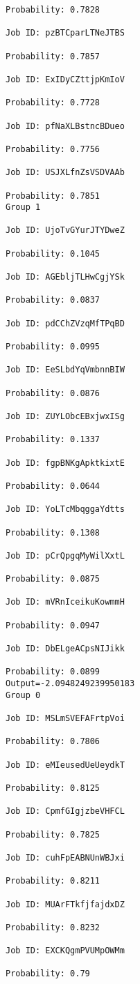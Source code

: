 \documentclass[11pt]{article}
\begin{document}
\begin{Verbatim}[commandchars=\\\{\}]
Probability: 0.7828

Job ID: pzBTCparLTNeJTBS

Probability: 0.7857

Job ID: ExIDyCZttjpKmIoV

Probability: 0.7728

Job ID: pfNaXLBstncBDueo

Probability: 0.7756

Job ID: USJXLfnZsVSDVAAb

Probability: 0.7851
Group 1

Job ID: UjoTvGYurJTYDweZ

Probability: 0.1045

Job ID: AGEbljTLHwCgjYSk

Probability: 0.0837

Job ID: pdCChZVzqMfTPqBD

Probability: 0.0995

Job ID: EeSLbdYqVmbnnBIW

Probability: 0.0876

Job ID: ZUYLObcEBxjwxISg

Probability: 0.1337

Job ID: fgpBNKgApktkixtE

Probability: 0.0644

Job ID: YoLTcMbqggaYdtts

Probability: 0.1308

Job ID: pCrQpgqMyWilXxtL

Probability: 0.0875

Job ID: mVRnIceikuKowmmH

Probability: 0.0947

Job ID: DbELgeACpsNIJikk

Probability: 0.0899
Output=-2.0948249239950183
Group 0

Job ID: MSLmSVEFAFrtpVoi

Probability: 0.7806

Job ID: eMIeusedUeUeydkT

Probability: 0.8125

Job ID: CpmfGIgjzbeVHFCL

Probability: 0.7825

Job ID: cuhFpEABNUnWBJxi

Probability: 0.8211

Job ID: MUArFTkfjfajdxDZ

Probability: 0.8232

Job ID: EXCKQgmPVUMpOWMm

Probability: 0.79


\end{Verbatim}
\end{document}
